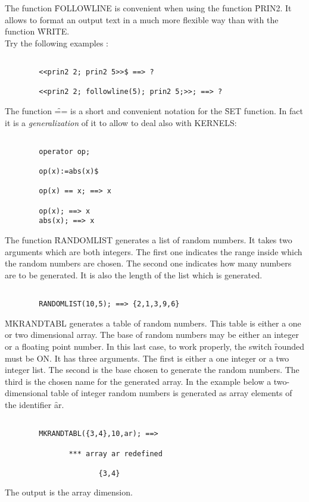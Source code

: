 The function \f{FOLLOWLINE} is convenient when using the function \f{PRIN2}.
It allows to format an output text in a much more flexible way than with
the function \f{WRITE}. \\
Try the following examples :
\begin{verbatim}

        <<prin2 2; prin2 5>>$ ==> ?

        <<prin2 2; followline(5); prin2 5;>>; ==> ?

\end{verbatim}
The function \f{==} is a short and convenient notation for the \f{SET}
function. In fact it is a {\em generalization} of it to allow to
deal also with KERNELS:
\begin{verbatim}

        operator op;

        op(x):=abs(x)$

        op(x) == x; ==> x

        op(x); ==> x
        abs(x); ==> x

\end{verbatim}
The function \f{RANDOMLIST} generates a list of random numbers. It takes
two arguments which are both integers. The first one indicates the range
inside which the random numbers are chosen. The second one indicates how
many numbers are to be generated. It is also the length of the list which
is generated.
\begin{verbatim}

        RANDOMLIST(10,5); ==> {2,1,3,9,6}

\end{verbatim}
\f{MKRANDTABL} generates a table of random numbers. This table is either
a one or two dimensional array. The base of random numbers may be either
an integer or a floating point number. In this last case, to work properly,
the switch \f{rounded} must be ON. It has three arguments. The first is
either a one integer or a two integer list. The second is the base chosen
to generate the random numbers. The third is the chosen name for the
generated array. In the example below a two-dimensional table of integer
random numbers is generated as array elements of the identifier {\f ar}.
\begin{verbatim}

        MKRANDTABL({3,4},10,ar); ==>

               *** array ar redefined

                      {3,4}

\end{verbatim}
The output is the array dimension.

